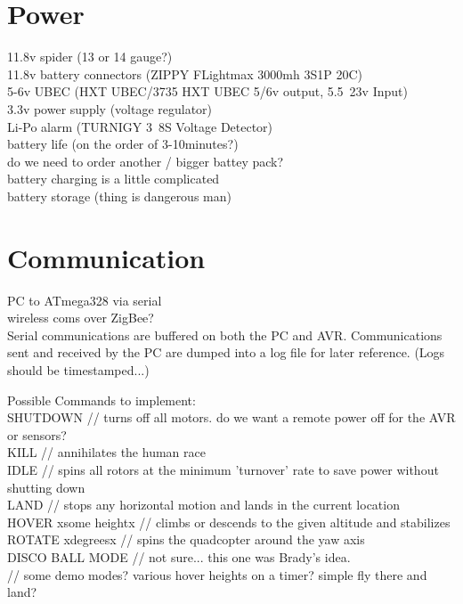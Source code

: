 \documentclass{article}
\begin{document}
\section{Power}
11.8v spider (13 or 14 gauge?)\\
11.8v battery connectors (ZIPPY FLightmax 3000mh 3S1P 20C)\\
5-6v UBEC (HXT UBEC/3735 HXT UBEC 5/6v output, 5.5~23v Input) \\
3.3v power supply (voltage regulator)\\
Li-Po alarm (TURNIGY 3~8S Voltage Detector)\\
battery life (on the order of 3-10minutes?)\\
do we need to order another / bigger battey pack?\\
battery charging is a little complicated\\
battery storage (thing is dangerous man)\\

\section{Communication}
PC to ATmega328 via serial\\
wireless coms over ZigBee?\\

Serial communications are buffered on both the PC and AVR.  Communications sent and received by the PC are dumped into a log file for later reference.  (Logs should be timestamped...)

Possible Commands to implement:\\

SHUTDOWN // turns off all motors.  do we want a remote power off for the AVR or sensors?\\
KILL // annihilates the human race\\
IDLE // spins all rotors at the minimum 'turnover' rate to save power without shutting down\\
LAND // stops any horizontal motion and lands in the current location\\
HOVER xsome heightx  // climbs or descends to the given altitude and stabilizes\\
ROTATE xdegreesx    // spins the quadcopter around the yaw axis\\
DISCO BALL MODE      // not sure... this one was Brady's idea.\\
// some demo modes? various hover heights on a timer?  simple fly there and land?\\
\end{document}
